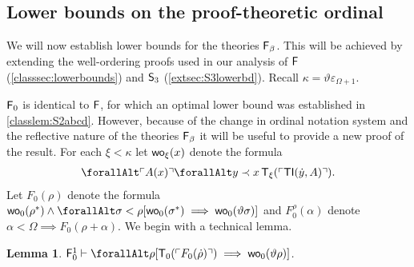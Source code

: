 \documentclass[UKenglish,cleveref,DIV=12]{scrartcl}
\let\forall\forallAlt
\newtheorem{lemma}{Lemma}
\theoremstyle{definition}
\theoremstyle{definition}
\begin{document}
\subsection{Lower bounds on the proof-theoretic ordinal}\label{extsec:Fblower}
We will now establish lower bounds for the theories $\mathsf{F}_\beta$. This will be achieved by extending the well-ordering proofs used in our analysis of $\mathsf{F}$ (\cref{classsec:lowerbounds}) and $\mathsf{S}_3$ (\cref{extsec:S3lowerbd}). Recall $\kappa=\vartheta\varepsilon_{\Omega+1}$.

%
$\mathsf{F}_0$ is identical to $\mathsf{F}$, for which an optimal lower bound was established
in \cref{classlem:S2abcd}. However, because of the change in ordinal notation
system and the reflective nature of the theories $\mathsf{F}_\beta$ it will be useful
to provide a new proof of the result.
For each $\xi<\kappa$ let $\mathsf{wo}_\xi(x)$ denote the formula
\begin{align*}
  \forall\gn {A(x)}\forall y\prec x\,\T_\xi(\gn{\TI(\dot y,A)}).
\end{align*}
Let $F_0(\rho)$ denote the formula $\wo_0(\rho^*)\land \forall\sigma<\rho[
\wo_0(\sigma^*)\implies \wo_0(\vartheta\sigma)]$ and $F_0^\rho(\alpha)$ denote
$\alpha<\Omega\implies F_0(\rho+\alpha)$. We begin with a technical lemma.
\begin{lemma}\label{extlem:F0tech}
 $\F_0^1\proves \forall\rho[\T_0(\gn{F_0(\dot\rho)})\implies \wo_0(\vartheta\rho)]$.
\end{lemma}
\end{document}
